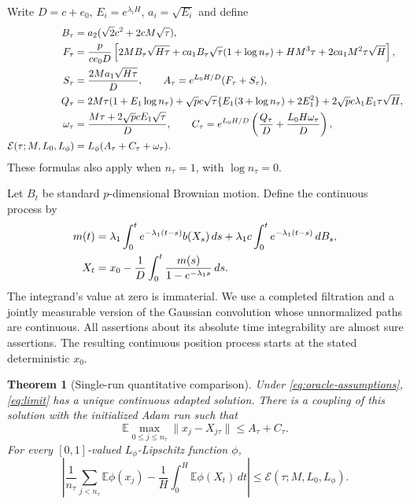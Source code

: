 \documentclass[a4paper,11pt]{article}
\newtheorem{theorem}{Theorem}[section]
\theoremstyle{remark}
\newcommand{\E}{\mathbb E}
\newcommand{\norm}[1]{\lVert#1\rVert}
\begin{document}
Write $D=c+e_0$, $E_i=e^{\lambda_iH}$, $a_i=\sqrt{E_i}$ and define
\begin{align}
 B_\tau&=a_2(\sqrt2c^2+2cM\sqrt\tau),\notag\\
 F_\tau&=\frac p{ce_0D}\left[
 2MB_\tau\sqrt{H\tau}
 +ca_1B_\tau\sqrt\tau(1+\log n_\tau)
 +HM^3\tau+2ca_1M^2\tau\sqrt H\right],\notag\\
 S_\tau&=\frac{2Ma_1\sqrt{H\tau}}D,\qquad
 A_\tau=e^{L_0H/D}(F_\tau+S_\tau),\notag\\
 Q_\tau&=2M\tau(1+E_1\log n_\tau)
 +\sqrt p c\sqrt\tau\{E_1(3+\log n_\tau)+2E_1^2\}
 +2\sqrt p c\lambda_1E_1\tau\sqrt H,\notag\\
 \omega_\tau&=\frac{M\tau+2\sqrt p cE_1\sqrt\tau}D,
 \qquad C_\tau=e^{L_0H/D}\left(\frac{Q_\tau}D+
                              \frac{L_0H\omega_\tau}D\right),\notag\\
 \mathcal E(\tau;M,L_0,L_\phi)&=L_\phi(A_\tau+C_\tau+\omega_\tau).
 \label{eq:constants}
\end{align}
These formulas also apply when $n_\tau=1$, with $\log n_\tau=0$.

Let $B_t$ be standard $p$-dimensional Brownian motion. Define the continuous
process by
\begin{align}
 m(t)&=\lambda_1\int_0^t e^{-\lambda_1(t-s)}b(X_s)\,ds
       +\lambda_1c\int_0^t e^{-\lambda_1(t-s)}\,dB_s,\notag\\
 X_t&=x_0-\frac1D\int_0^t\frac{m(s)}{1-e^{-\lambda_1s}}\,ds.
 \label{eq:limit}
\end{align}
The integrand's value at zero is immaterial.
We use a completed filtration and a jointly measurable version of the
Gaussian convolution whose unnormalized paths are continuous. All assertions
about its absolute time integrability are almost sure assertions. The
resulting continuous position process starts at the stated deterministic
$x_0$.

\begin{theorem}[Single-run quantitative comparison]\label{thm:coupling}
Under \eqref{eq:oracle-assumptions}, \eqref{eq:limit} has a unique continuous
adapted solution. There is a coupling of this solution with the initialized
Adam run such that
\begin{equation}\label{eq:grid-error}
 \E\max_{0\le j\le n_\tau}\norm{x_j-X_{j\tau}}
 \le A_\tau+C_\tau.
\end{equation}
For every $[0,1]$-valued $L_\phi$-Lipschitz function $\phi$,
\begin{equation}\label{eq:observable-error}
 \left|\frac1{n_\tau}\sum_{j<n_\tau}\E\phi(x_j)
          -\frac1H\int_0^H\E\phi(X_t)\,dt\right|
 \le\mathcal E(\tau;M,L_0,L_\phi).
\end{equation}
\end{theorem}
\end{document}
